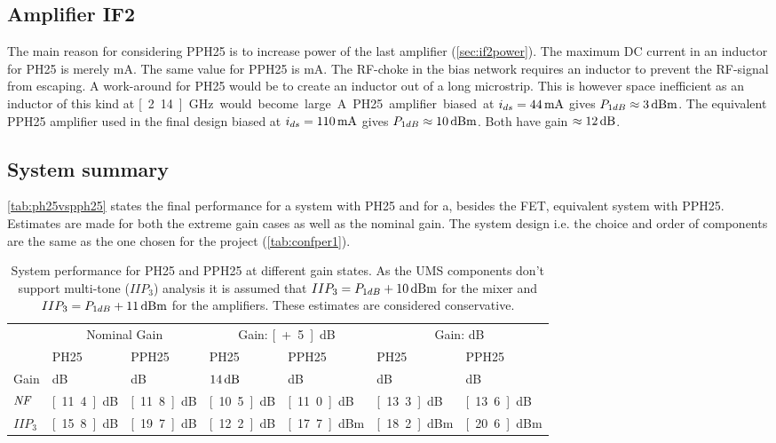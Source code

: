 		\subsection{Amplifier IF2}
			The main reason for considering PPH25 is to increase power of the last amplifier (\autoref{sec:if2power}). The maximum DC current in an inductor for PH25 is merely \unit[44]{mA}.\autocite{ph25manual} The same value for PPH25 is \unit[130]{mA}.\autocite{pph25manual} The RF-choke in the bias network requires an inductor to prevent the RF-signal from escaping. A work-around for PH25 would be to create an inductor out of a long microstrip. This is however space inefficient as an inductor of this kind at \unit[2.14]{GHz} would become large.

			A PH25 amplifier biased at $i_{ds}=\unit[44]{mA}$ gives $P_{1dB}\approx \unit[3]{dBm}$. The equivalent PPH25 amplifier used in the final design biased at $i_{ds}=\unit[110]{mA}$ gives $P_{1dB}\approx \unit[10]{dBm}$. Both have gain $\approx \unit[12]{dB}$.

		\subsection{System summary}
			\autoref{tab:ph25vspph25} states the final performance for a system with PH25 and for a, besides the FET, equivalent system with PPH25. Estimates are made for both the extreme gain cases as well as the nominal gain. The system design i.e. the choice and order of components are the same as the one chosen for the project (\autoref{tab:confper1}).

			\begin{table}[hbt!]
				\caption[PH25 vs PPH25 system performance.]{System performance for PH25 and PPH25 at different gain states. As the UMS components don't support multi-tone ($IIP_3$) analysis it is assumed that $IIP_3=P_{1dB}+\unit[10]{dBm}$ for the mixer and $IIP_3=P_{1dB}+\unit[11]{dBm}$ for the amplifiers. These estimates are considered conservative.}
				\label{tab:ph25vspph25}
				\centering
				\begin{tabular}{ l l l l l l l } \toprule
					& \multicolumn{2}{c}{Nominal Gain} & \multicolumn{2}{c}{Gain: \unit[+5]{dB}} & \multicolumn{2}{c}{Gain: \unit[-5]{dB}} \\\cmidrule{2-7}
					& PH25 & PPH25 & PH25 & PPH25 & PH25 & PPH25 \\\cmidrule{2-7}
					Gain & \unit[9]{dB} & \unit[9]{dB} & $\unit[14]{dB}$ & \unit[14]{dB} & \unit[4]{dB} & \unit[4]{dB} \\
					$\emph{NF}$ & \unit[11.4]{dB} & \unit[11.8]{dB} & \unit[10.5]{dB} & \unit[11.0]{dB} & \unit[13.3]{dB} & \unit[13.6]{dB} \\
					$IIP_3$ & \unit[15.8]{dB} & \unit[19.7]{dB} & \unit[12.2]{dB} & \unit[17.7]{dBm} & \unit[18.2]{dBm} & \unit[20.6]{dBm} \\\bottomrule
				\end{tabular}
			\end{table}

